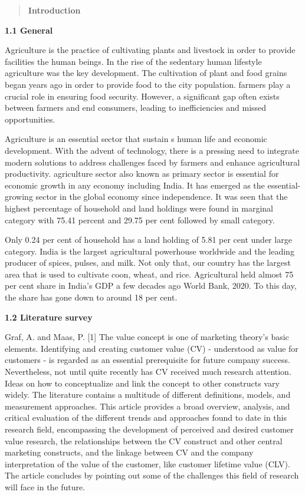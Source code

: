 \documentclass[
]{article}
\author{}
\date{}
\begin{document}
\begin{quote}
\textbf{Introduction}
\end{quote}

\textbf{1.1 General}

Agriculture is the practice of cultivating plants and livestock in order
to provide facilities the human beings. In the rise of the sedentary
human lifestyle agriculture was the key development. The cultivation of
plant and food grains began years ago in order to provide food to the
city population. farmers play a crucial role in ensuring food security.
However, a significant gap often exists between farmers and end
consumers, leading to inefficiencies and missed opportunities.

Agriculture is an essential sector that sustain s human life and
economic development. With the advent of technology, there is a pressing
need to integrate modern solutions to address challenges faced by
farmers and enhance agricultural productivity. agriculture sector also
known as primary sector is essential for economic growth in any economy
including India. It has emerged as the essential-growing sector in the
global economy since independence. It was seen that the highest
percentage of household and land holdings were found in marginal
category with 75.41 percent and 29.75 per cent followed by small
category.

Only 0.24 per cent of household has a land holding of 5.81 per cent
under large category. India is the largest agricultural powerhouse
worldwide and the leading producer of spices, pulses, and milk. Not only
that, our country has the largest area that is used to cultivate coon,
wheat, and rice. Agricultural held almost 75 per cent share in India's
GDP a few decades ago World Bank, 2020. To this day, the share has gone
down to around 18 per cent.

\textbf{1.2 Literature survey}

Graf, A. and Maas, P. {[}1{]} The value concept is one of marketing
theory's basic elements. Identifying and creating customer value (CV) -
understood as value for customers - is regarded as an essential
prerequisite for future company success. Nevertheless, not until quite
recently has CV received much research attention. Ideas on how to
conceptualize and link the concept to other constructs vary widely. The
literature contains a multitude of different definitions, models, and
measurement approaches. This article provides a broad overview,
analysis, and critical evaluation of the different trends and approaches
found to date in this research field, encompassing the development of
perceived and desired customer value research, the relationships between
the CV construct and other central marketing constructs, and the linkage
between CV and the company interpretation of the value of the customer,
like customer lifetime value (CLV). The article concludes by pointing
out some of the challenges this field of research will face in the
future.
\end{document}
